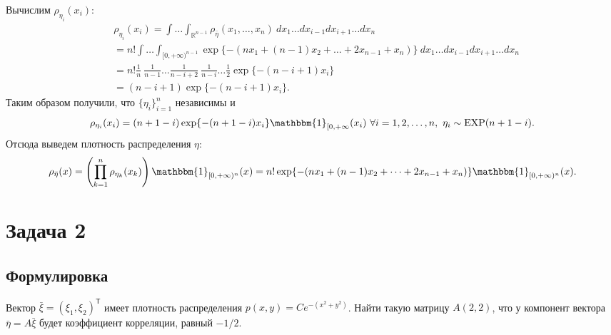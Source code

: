 \documentclass[specialist,
substylefile = spbu_report.rtx,
subf,href,colorlinks=true, 12pt]{disser}
\newcommand{\R}{\mathbb{R}}
\begin{document}
	Вычислим $\rho_{\eta_i}(x_i)$:
	\begin{align*}
		&\rho_{\eta_i}(x_i) = \int\dots\int_{\R^{n-1}}\rho_{\bar{\eta}}(x_1,\dots,x_n)~dx_1\dots dx_{i-1}dx_{i+1}\dots dx_n
		\\&=n!\int\dots\int_{[0,+\infty)^{n-1}}\exp\{-(nx_1 + (n-1)x_2 + \dots + 2x_{n-1} + x_n)\}~dx_1\dots dx_{i-1}dx_{i+1}\dots dx_n
		\\&=n!\frac{1}{n}~\frac{1}{n-1}\dots\frac{1}{n-i+2}~\frac{1}{n-i}\dots\frac{1}{2}\exp\{-(n-i+1)x_i\}
		\\&=(n-i+1)\exp\{-(n-i+1)x_i\}.
	\end{align*}
	Таким образом получили, что $\{\eta_i\}_{i=1}^n$ независимы и
	\begin{equation*}
		\rho_{\eta_i}(x_i) = (n+1-i)\exp\{-(n+1-i)x_i\}\mathbbm{1}_{[0,+\infty}(x_i)~\forall i = 1, 2,\dots,n,~\eta_i\sim\mathrm{EXP}(n+1-i).
	\end{equation*}
	Отсюда выведем плотность распределения $\eta$:
	\begin{equation*}
		\rho_{\bar{\eta}}(x) = \left(\prod_{k=1}^n\rho_{\eta_k}(x_k)\right)\mathbbm{1}_{[0,+\infty)^n}(x)=n!\exp\{-(nx_1+(n-1)x_2+\dots+2x_{n-1}+x_n)\}\mathbbm{1}_{[0,+\infty)^n}(x).
	\end{equation*}
	\section{Задача 2}
	\subsection{Формулировка}
	Вектор $\bar{\xi}=(\xi_1,\xi_2)^\mathsf{T}$ имеет плотность распределения $p(x,y)=Ce^{-(x^2+y^2)}$. Найти такую матрицу $A(2,2)$, что у компонент вектора $\bar{\eta} = A\bar{\xi}$ будет коэффициент корреляции, равный $-1/2.$
\end{document}
